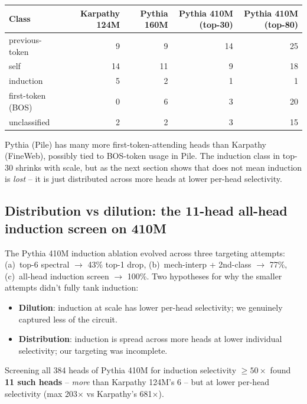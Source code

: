 \documentclass[11pt]{article}
\begin{document}
\begin{center}
\small
\begin{tabular}{lrrrr}
\toprule
Class & Karpathy 124M & Pythia 160M & Pythia 410M (top-30) & Pythia 410M (top-80) \\
\midrule
previous-token & 9  & 9 & 14 & 25 \\
self           & 14 & 11 & 9 & 18 \\
induction      & 5  & 2 & 1 & 1 \\
first-token (BOS) & 0 & 6 & 3 & 20 \\
unclassified   & 2  & 2 & 3 & 15 \\
\bottomrule
\end{tabular}
\end{center}

Pythia (Pile) has many more first-token-attending heads than Karpathy (FineWeb), possibly tied to BOS-token usage in Pile. The induction class in top-30 shrinks with scale, but as the next section shows that does not mean induction is \emph{lost} -- it is just distributed across more heads at lower per-head selectivity.

\subsection{Distribution vs dilution: the 11-head all-head induction screen on 410M}
\label{sec:distribution_vs_dilution}

The Pythia 410M induction ablation evolved across three targeting attempts: (a)~top-6 spectral $\to$ 43\% top-1 drop, (b)~mech-interp + 2nd-class $\to$ 77\%, (c)~all-head induction screen $\to$ 100\%. Two hypotheses for why the smaller attempts didn't fully tank induction:

\begin{itemize}[leftmargin=*,topsep=2pt,itemsep=2pt]
\item \textbf{Dilution}: induction at scale has lower per-head selectivity; we genuinely captured less of the circuit.
\item \textbf{Distribution}: induction is spread across more heads at lower individual selectivity; our targeting was incomplete.
\end{itemize}

Screening all 384 heads of Pythia 410M for induction selectivity $\geq 50\times$ found \textbf{11 such heads} -- \emph{more} than Karpathy 124M's 6 -- but at lower per-head selectivity (max 203$\times$ vs Karpathy's 681$\times$).
\end{document}

